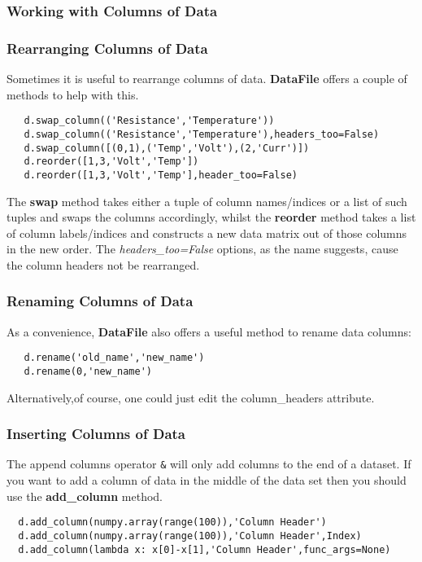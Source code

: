 \documentclass[a4paper,11pt]{scrartcl}
\begin{document}
\subsubsection{Working with Columns of Data}
\subsubsection{Rearranging Columns of Data}
Sometimes it is useful to rearrange columns of data. \textbf{DataFile} offers a couple of methods to help with this.
\begin{lstlisting}
   d.swap_column(('Resistance','Temperature'))
   d.swap_column(('Resistance','Temperature'),headers_too=False)
   d.swap_column([(0,1),('Temp','Volt'),(2,'Curr')])
   d.reorder([1,3,'Volt','Temp'])
   d.reorder([1,3,'Volt','Temp'],header_too=False)
\end{lstlisting}

The \textbf{swap} method takes either a tuple of column names/indices or a list of such tuples and swaps the columns accordingly, whilst the \textbf{reorder} method takes a list of column labels/indices and constructs a new data matrix out of those columns in the new order. The \textit{headers\_too=False} options, as the name suggests, cause the column headers not be rearranged.

\subsubsection{Renaming Columns of Data}
As a convenience, \textbf{DataFile} also offers a useful method to rename data columns:

\begin{lstlisting}
   d.rename('old_name','new_name')
   d.rename(0,'new_name')
\end{lstlisting}

Alternatively,of course, one could just edit the column\_headers attribute.

\subsubsection{Inserting Columns of Data}
The append columns operator \verb#&# will only add columns to the end of a
dataset. If you want to add a column of data in the middle of the data set then
you should use the \textbf{add\_column} method.

\begin{lstlisting}
  d.add_column(numpy.array(range(100)),'Column Header')
  d.add_column(numpy.array(range(100)),'Column Header',Index)
  d.add_column(lambda x: x[0]-x[1],'Column Header',func_args=None)
\end{lstlisting}
\end{document}
